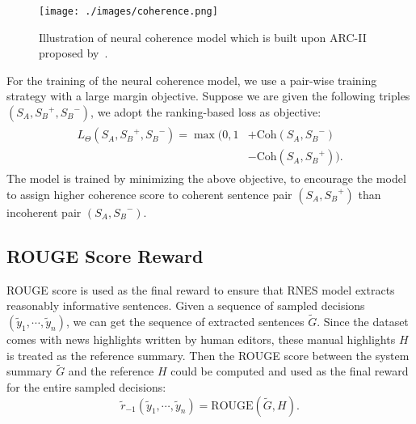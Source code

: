 \documentclass[letterpaper]{article} \usepackage{aaai18}  \usepackage{times}  \usepackage{helvet}  \usepackage{courier}  \usepackage{url}  \usepackage{graphicx}  \usepackage{amssymb}
\begin{document}
	\begin{figure}
		\texttt{[image: ./images/coherence.png]}
		\caption{Illustration of neural coherence model which is built upon ARC-II proposed by~\cite{NIPS2014_hu}.}
		\label{coherence}
	\end{figure}
	
	For the training of the neural coherence model, we use a pair-wise training strategy with a large margin objective. 
	Suppose we are given the following triples $(S_A, {S_B}^{+},{S_B}^{-})$, we adopt the ranking-based loss as objective:
	\begin{align*}
	\begin{split}
	L_\Theta({S_A}, {S_B}^+, {S_B}^-) = 
	\max(0, 1 &+\text{Coh}({S_A, {S_B}^-})\\
	&-\text{Coh}({S_A}, {S_B}^+)).
	\end{split}
\end{align*}
	The model is trained by minimizing the above objective, to encourage the model to assign higher coherence score to coherent sentence pair $(S_A, {S_B}^+)$ than incoherent pair $({S_A}, {S_B}^-)$.
	


	
	\subsection{ROUGE Score Reward}
	\label{rsr}
	ROUGE score is used as the final reward to ensure that RNES model extracts reasonably informative sentences. Given a sequence of sampled decisions $(\tilde{y}_1, \cdots, \tilde{y}_n)$, we can get the sequence of extracted sentences $\tilde{G}$. Since the dataset comes with news highlights written by human editors, these manual highlights $H$ is treated as the reference summary. Then the ROUGE score between the system summary $\tilde{G}$ and the reference $H$  could be computed and used as the final reward for the entire sampled decisions:
	\[ \tilde{r}_{-1}(\tilde{y}_1, \cdots, \tilde{y}_n) = \text{ROUGE}(\tilde{G}, H). \]
\end{document}
